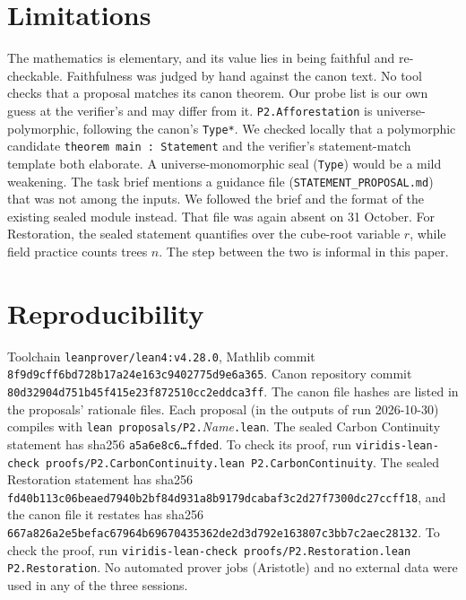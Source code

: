 \documentclass[11pt]{article}
\theoremstyle{definition}
\theoremstyle{remark}
\begin{document}
\section{Limitations}
The mathematics is elementary, and its value lies in being faithful and re-checkable.
Faithfulness was judged by hand against the canon text. No tool checks that a proposal matches its canon theorem.
Our probe list is our own guess at the verifier's and may differ from it.
\texttt{P2.Afforestation} is universe-polymorphic, following the canon's \texttt{Type*}. We checked locally that a polymorphic
candidate \texttt{theorem main : Statement} and the verifier's statement-match template both elaborate.
A universe-monomorphic seal (\texttt{Type}) would be a mild weakening.
The task brief mentions a guidance file (\texttt{STATEMENT\_PROPOSAL.md}) that was not among the inputs.
We followed the brief and the format of the existing sealed module instead. That file was again absent on 31 October.
For Restoration, the sealed statement quantifies over the cube-root variable $r$, while field practice counts trees $n$.
The step between the two is informal in this paper.

\section{Reproducibility}
Toolchain \texttt{leanprover/lean4:v4.28.0}, Mathlib commit \texttt{8f9d9cff6bd728b17a24e163c9402775d9e6a365}.
Canon repository commit \texttt{80d32904d751b45f415e23f872510cc2eddca3ff}. The canon file hashes are listed in the proposals' rationale files.
Each proposal (in the outputs of run 2026-10-30) compiles with \texttt{lean proposals/P2.}\textit{Name}\texttt{.lean}.
The sealed Carbon Continuity statement has sha256 \texttt{a5a6e8c6\ldots ffded}. To check its proof, run
\texttt{viridis-lean-check proofs/P2.CarbonContinuity.lean P2.CarbonContinuity}.
The sealed Restoration statement has sha256 \texttt{fd40b113c06beaed7940b2bf84d931a8b9179dcabaf3c2d27f7300dc27ccff18},
and the canon file it restates has sha256 \texttt{667a826a2e5befac67964b69670435362de2d3d792e163807c3bb7c2aec28132}.
To check the proof, run \texttt{viridis-lean-check proofs/P2.Restoration.lean P2.Restoration}.
No automated prover jobs (Aristotle) and no external data were used in any of the three sessions.
\end{document}
